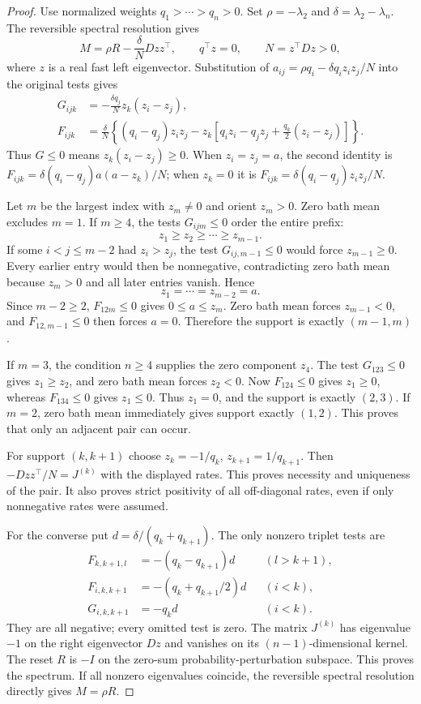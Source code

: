 \documentclass[11pt]{article}
\begin{document}
\begin{proof}
Use normalized weights $q_1>\cdots>q_n>0$.
Set $\rho=-\lambda_2$ and $\delta=\lambda_2-\lambda_n$.
The reversible spectral resolution gives
\[
M=\rho R-\frac{\delta}{N}Dzz^\top,
\qquad q^\top z=0,\qquad N=z^\top Dz>0,
\]
where $z$ is a real fast left eigenvector. Substitution of
$a_{ij}=\rho q_i-\delta q_i z_i z_j/N$ into the original tests gives
\begin{align*}
G_{ijk}&=-\frac{\delta q_j}{N}z_k(z_i-z_j),\\
F_{ijk}&=\frac{\delta}{N}\left\{
(q_i-q_j)z_i z_j-z_k\left[q_i z_i-q_j z_j
 +\frac{q_k}{2}(z_i-z_j)\right]\right\}.
\end{align*}
Thus $G\leq0$ means $z_k(z_i-z_j)\geq0$.
When $z_i=z_j=a$, the second identity is
$F_{ijk}=\delta(q_i-q_j)a(a-z_k)/N$; when $z_k=0$ it is
$F_{ijk}=\delta(q_i-q_j)z_i z_j/N$.

Let $m$ be the largest index with $z_m\ne0$ and orient $z_m>0$.
Zero bath mean excludes $m=1$.
If $m\geq4$, the tests $G_{ijm}\leq0$ order the entire prefix:
\[
z_1\geq z_2\geq\cdots\geq z_{m-1}.
\]
If some $i<j\leq m-2$ had $z_i>z_j$, the test
$G_{ij,m-1}\leq0$ would force $z_{m-1}\geq0$.
Every earlier entry would then be nonnegative, contradicting zero bath
mean because $z_m>0$ and all later entries vanish. Hence
\[
z_1=\cdots=z_{m-2}=a.
\]
Since $m-2\geq2$, $F_{12m}\leq0$ gives $0\leq a\leq z_m$.
Zero bath mean forces $z_{m-1}<0$, and $F_{12,m-1}\leq0$
then forces $a=0$. Therefore the support is exactly $(m-1,m)$.

If $m=3$, the condition $n\geq4$ supplies the zero component $z_4$.
The test $G_{123}\leq0$ gives $z_1\geq z_2$, and zero bath mean
forces $z_2<0$. Now $F_{124}\leq0$ gives $z_1\geq0$, whereas
$F_{134}\leq0$ gives $z_1\leq0$. Thus $z_1=0$, and the support
is exactly $(2,3)$. If $m=2$, zero bath mean immediately gives support
exactly $(1,2)$. This proves that only an adjacent pair can occur.

For support $(k,k+1)$ choose
$z_k=-1/q_k$, $z_{k+1}=1/q_{k+1}$.
Then $-Dzz^\top/N=J^{(k)}$ with the displayed rates. This proves
necessity and uniqueness of the pair. It also proves strict positivity
of all off-diagonal rates, even if only nonnegative rates were assumed.

For the converse put $d=\delta/(q_k+q_{k+1})$.
The only nonzero triplet tests are
\begin{align*}
F_{k,k+1,l}&=-(q_k-q_{k+1})d &&(l>k+1),\\
F_{i,k,k+1}&=-(q_k+q_{k+1}/2)d &&(i<k),\\
G_{i,k,k+1}&=-q_kd &&(i<k).
\end{align*}
They are all negative; every omitted test is zero.
The matrix $J^{(k)}$ has eigenvalue $-1$ on the right eigenvector
$Dz$ and vanishes on its $(n-1)$-dimensional kernel. The reset $R$
is $-I$ on the zero-sum probability-perturbation subspace. This proves
the spectrum. If all nonzero eigenvalues coincide, the reversible
spectral resolution directly gives $M=\rho R$.


\end{proof}
\end{document}
